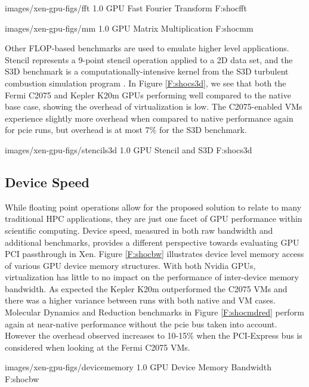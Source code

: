 
  {images/xen-gpu-figs/fft}
  {1.0}
  {GPU Fast Fourier Transform}
  {F:shocfft} 

  {images/xen-gpu-figs/mm}
  {1.0}
  {GPU Matrix Multiplication}
  {F:shocmm} 


Other FLOP-based benchmarks are used to emulate higher level applications.  Stencil represents a 9-point stencil operation applied to a 2D data set, and the S3D benchmark is a computationally-intensive kernel from the S3D turbulent combustion simulation program \cite{hawkes2005direct}. In Figure \ref{F:shocs3d}, we see that both the Fermi C2075 and Kepler K20m GPUs performing well compared to the native base case, showing the overhead of virtualization is low.  The C2075-enabled VMs experience slightly more overhead when compared to native performance again for pcie runs, but overhead is at most 7\% for the S3D benchmark. 


  {images/xen-gpu-figs/stencils3d}
  {1.0}
  {GPU Stencil and S3D}
  {F:shocs3d} 



\subsection{Device Speed}

While floating point operations allow for the proposed solution to relate to many traditional HPC applications, they are just one facet of GPU performance within scientific computing. Device speed, measured in both raw bandwidth and additional benchmarks, provides a different perspective towards evaluating GPU PCI passthrough in Xen. Figure \ref{F:shocbw} illustrates device level memory access of various GPU device memory structures. With both Nvidia GPUs, virtualization has little to no impact on the performance of inter-device memory bandwidth. As expected the Kepler K20m outperformed the C2075 VMs and there was a higher variance between runs with both native and VM cases.  Molecular Dynamics and Reduction benchmarks in Figure \ref{F:shocmdred} perform again at near-native performance without the pcie bus taken into account. However the overhead observed increases to 10-15\% when the PCI-Express bus is considered when looking at the Fermi C2075 VMs. 

  {images/xen-gpu-figs/devicememory}
  {1.0}
  {GPU Device Memory Bandwidth}
  {F:shocbw} 


